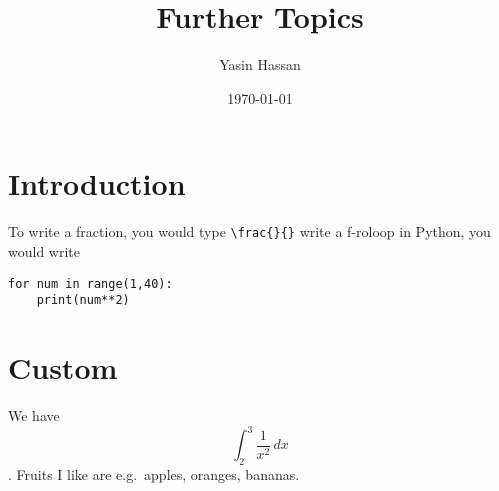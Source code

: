 \documentclass{article}
\title{Further Topics}
\author{Yasin Hassan}
\date{\today}
\newcommand{\intinf}[2]{\int_{#1}^{#2}} %
\newcommand{\eg}{e.g.\ }
\begin{document}
\maketitle

\section{Introduction}
To write a fraction, you would type \verb+\frac{}{}+ %
write a f-roloop in Python, you would write
\begin{verbatim}
for num in range(1,40):
    print(num**2)
\end{verbatim}




\section{Custom}
We have \[\intinf{2}{3} \frac{1}{x^2} \, dx\].
Fruits I like are \eg apples, oranges, bananas.
\end{document}
